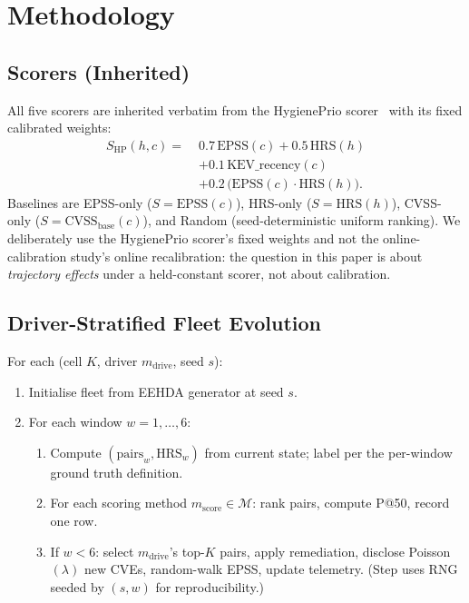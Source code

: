 \section{Methodology}

\subsection{Scorers (Inherited)}

All five scorers are inherited verbatim from the HygienePrio scorer~\cite{paper4hygieneprio}
with its fixed calibrated weights:
\begin{equation}
\begin{aligned}
S_{\mathrm{HP}}(h,c) =\;& 0.7\,\mathrm{EPSS}(c) + 0.5\,\mathrm{HRS}(h) \\
 & + 0.1\,\mathrm{KEV\_recency}(c) \\
 & + 0.2\,\bigl(\mathrm{EPSS}(c) \cdot \mathrm{HRS}(h)\bigr).
\end{aligned}
\end{equation}
Baselines are EPSS-only ($S = \mathrm{EPSS}(c)$), HRS-only ($S = \mathrm{HRS}(h)$),
CVSS-only ($S = \mathrm{CVSS}_{\mathrm{base}}(c)$), and Random
(seed-deterministic uniform ranking). We deliberately use the HygienePrio scorer's
fixed weights and not the online-calibration study's online recalibration: the question
in this paper is about \textit{trajectory effects} under a held-constant
scorer, not about calibration.

\subsection{Driver-Stratified Fleet Evolution}

For each (cell $K$, driver $m_{\text{drive}}$, seed $s$):
\begin{enumerate}
\item Initialise fleet from EEHDA generator at seed $s$.
\item For each window $w = 1, \ldots, 6$:
\begin{enumerate}
\item Compute $(\text{pairs}_w, \text{HRS}_w)$ from current state;
label per the per-window ground truth definition.
\item For each scoring method $m_{\text{score}} \in \mathcal{M}$:
rank pairs, compute P@50, record one row.
\item If $w < 6$: select $m_{\text{drive}}$'s top-$K$ pairs, apply
remediation, disclose Poisson$(\lambda)$ new CVEs, random-walk EPSS,
update telemetry. (Step uses RNG seeded by $(s, w)$ for reproducibility.)
\end{enumerate}
\end{enumerate}

